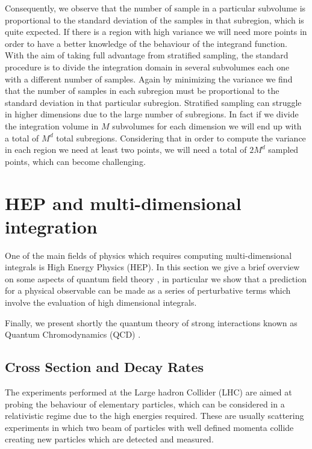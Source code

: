 \documentclass[../main/main.tex]{subfiles}
\begin{document}
Consequently, we observe that the number of sample in a particular subvolume is proportional to the standard deviation of the samples in that subregion, which is quite expected. If there is a region with high variance we will need more points in order to have a better knowledge of the behaviour of the 
integrand function.
\newline
With the aim of taking full advantage from stratified sampling, the standard procedure is to divide
the integration domain in several subvolumes each one with a different number of samples. Again by minimizing the variance we find that the number of samples in each subregion must be proportional
to the standard deviation in that particular subregion.
\newline
Stratified sampling can struggle in higher dimensions due to the large number of subregions.
In fact if we divide the integration volume in $M$ subvolumes for each dimension we will end up with a total of $M^d$  total subregions. Considering that in order to compute the variance in each region we need at least two points, we will need a total of $2 M^d$ sampled points, which can become challenging.



\section{HEP and multi-dimensional integration}
One of the main fields of physics which requires computing multi-dimensional integrals is High Energy Physics (HEP).
In this section we give a brief overview on some aspects of quantum field theory \cite{Peskin:1995ev, Schwartz:2017hep}, in particular we show that a prediction for a physical
observable can be made as a series of perturbative terms which involve the evaluation of high dimensional integrals.

Finally, we present shortly the quantum theory of strong interactions known as Quantum Chromodynamics (QCD) \cite{Collins:2011zzd, Muta:2010xua, Ellis:1991qj, Skands:2012ts}.


\subsection{Cross Section and Decay Rates}
The experiments performed at the Large hadron Collider (LHC) \cite{Aad:2008zzm, Chatrchyan:2008aa} are aimed at probing the behaviour of elementary particles, which can be considered in a 
relativistic regime due to the high energies required. These are usually scattering experiments in which two beam of particles with well defined momenta collide creating new particles which are detected and measured.
\end{document}
